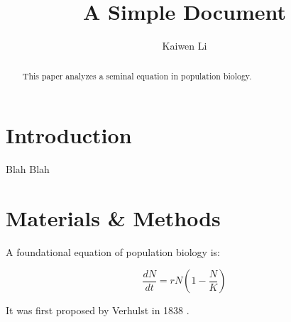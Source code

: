 \documentclass[12pt]{article}
\title{A Simple Document}
\author{Kaiwen Li}
\date{}
\begin{document}
\maketitle

\begin{abstract}
    This paper analyzes a seminal equation in population biology.
\end{abstract}

\section{Introduction}
Blah Blah

\section{Materials & Methods}
A foundational equation of population biology is:

\begin{equation}
    \frac{dN}{dt} = r N (1 - \frac{N}{K})
\end{equation}

It was first proposed by Verhulst in 1838 \cite{verhulst1838notice}.



\end{document}
